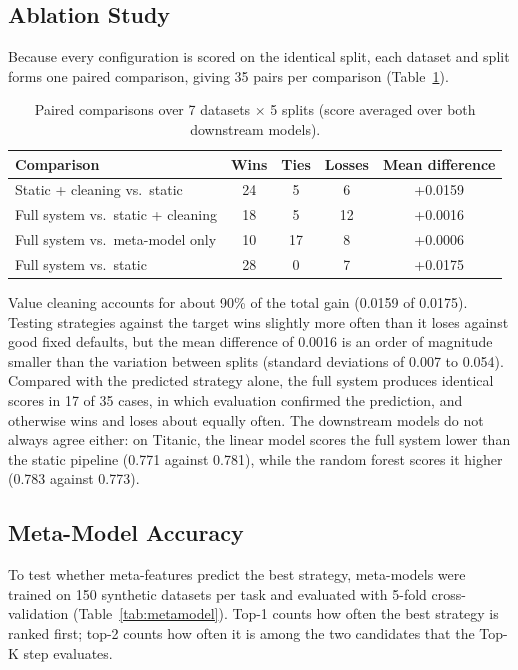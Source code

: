 \documentclass[11pt,a4paper]{article}
\begin{document}
\subsection{Ablation Study}

Because every configuration is scored on the identical split, each dataset and split forms one paired comparison, giving 35 pairs per comparison (Table~\ref{tab:ablation}).

\begin{table}[ht]
\centering
\caption{Paired comparisons over 7 datasets $\times$ 5 splits (score averaged over both downstream models).}
\label{tab:ablation}
\begin{tabular}{lcccc}
\toprule
\textbf{Comparison} & \textbf{Wins} & \textbf{Ties} & \textbf{Losses} & \textbf{Mean difference} \\
\midrule
Static + cleaning vs.\ static & 24 & 5 & 6 & +0.0159 \\
Full system vs.\ static + cleaning & 18 & 5 & 12 & +0.0016 \\
Full system vs.\ meta-model only & 10 & 17 & 8 & +0.0006 \\
Full system vs.\ static & 28 & 0 & 7 & +0.0175 \\
\bottomrule
\end{tabular}
\end{table}

Value cleaning accounts for about 90\% of the total gain (0.0159 of 0.0175). Testing strategies against the target wins slightly more often than it loses against good fixed defaults, but the mean difference of 0.0016 is an order of magnitude smaller than the variation between splits (standard deviations of 0.007 to 0.054). Compared with the predicted strategy alone, the full system produces identical scores in 17 of 35 cases, in which evaluation confirmed the prediction, and otherwise wins and loses about equally often. The downstream models do not always agree either: on Titanic, the linear model scores the full system lower than the static pipeline (0.771 against 0.781), while the random forest scores it higher (0.783 against 0.773).

\subsection{Meta-Model Accuracy}

To test whether meta-features predict the best strategy, meta-models were trained on 150 synthetic datasets per task and evaluated with 5-fold cross-validation (Table~\ref{tab:metamodel}). Top-1 counts how often the best strategy is ranked first; top-2 counts how often it is among the two candidates that the Top-K step evaluates.
\end{document}
